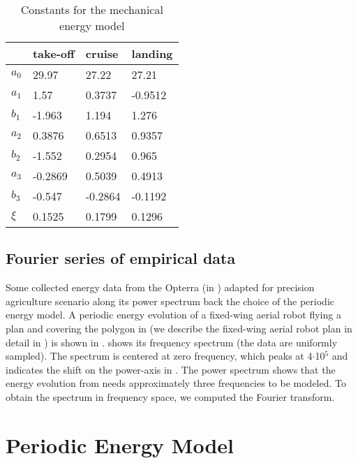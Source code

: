 \begin{table}[h]
  \centering
  \caption{Constants for the mechanical energy model}
  \begin{tabular}{l|lll}
    \hline
     & take-off & cruise & landing \\\hline
    $a_0$ & 29.97   & 27.22   & 27.21\\
    $a_1$ & 1.57    & 0.3737  & -0.9512\\
    $b_1$ & -1.963  & 1.194   & 1.276\\
    $a_2$ & 0.3876  & 0.6513  & 0.9357\\
    $b_2$ & -1.552  & 0.2954  & 0.965\\
    $a_3$ & -0.2869 & 0.5039  & 0.4913\\
    $b_3$ & -0.547  & -0.2864 & -0.1192\\
    $\xi$ & 0.1525  & 0.1799  & 0.1296\\
    \hline
  \end{tabular}
  \label{tab:constants}
\end{table}

\subsection{\color{cyan}Fourier series of empirical data}
\label{sec:fourier}

Some collected energy data from the Opterra (in ) adapted for precision agriculture scenario along its power spectrum back the choice of the periodic energy model. A periodic energy evolution of a fixed-wing aerial robot flying a plan and covering the polygon in  (we describe the fixed-wing aerial robot plan in detail in ) is shown in .  shows its frequency spectrum (the data are uniformly sampled). The spectrum is centered at zero frequency, which peaks at 4$\cdot$10${}^{\text{5}}$ and indicates the shift on the power-axis in . The power spectrum shows that the energy evolution from  needs approximately three frequencies to be modeled. To obtain the spectrum in frequency space, we computed the Fourier transform.


\section{Periodic Energy Model}
\label{sec:periodic-model}

